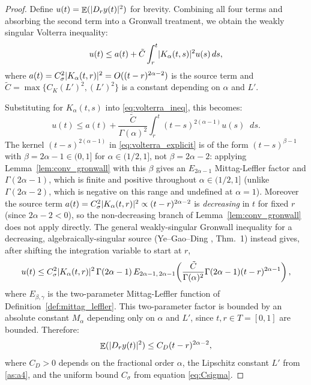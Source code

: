 \documentclass[11pt, a4paper]{article}
\theoremstyle{theoremstyle}
\theoremstyle{definitionstyle}
\newcommand{\dd}{\mathop{}\!d}
\DeclareMathOperator{\EE}{\mathbb E}
\DeclarePairedDelimiter{\abs}{\lvert}{\rvert}
\begin{document}
\begin{proof}
    Define $u(t) = \EE(\abs{D_ry(t)}^2)$ for brevity. Combining all four terms and absorbing the second term into a Gronwall treatment, we obtain the weakly singular Volterra inequality:
    \begin{equation}\label{eq:volterra_ineq}
        u(t) \leq a(t) + \tilde C \int_r^t \abs{K_\alpha(t, s)}^2 u(s) \dd{s},
    \end{equation}
    where $a(t) = C_\sigma^2 \abs{K_\alpha(t, r)}^2 = O((t - r)^{2\alpha - 2})$ is the source term and $\tilde C = \max\{C_K(L')^2, (L')^2\}$ is a constant depending on $\alpha$ and $L'$.
    
    Substituting for $K_\alpha(t, s)$ into \eqref{eq:volterra_ineq}, this becomes:
    \begin{equation}\label{eq:volterra_explicit}
        u(t) \leq a(t) + \frac{\tilde{C}}{\Gamma(\alpha)^2} \int_r^t (t - s)^{2(\alpha - 1)} u(s) \dd{s}.
    \end{equation}
    The kernel $(t-s)^{2(\alpha-1)}$ in \eqref{eq:volterra_explicit} is of the form $(t-s)^{\beta-1}$ with $\beta = 2\alpha - 1 \in (0,1]$ for $\alpha \in (1/2,1]$, not $\beta = 2\alpha-2$: applying Lemma~\ref{lem:conv_gronwall} with this $\beta$ gives an $E_{2\alpha-1}$ Mittag-Leffler factor and $\Gamma(2\alpha-1)$, which is finite and positive throughout $\alpha \in (1/2,1]$ (unlike $\Gamma(2\alpha-2)$, which is negative on this range and undefined at $\alpha=1$). Moreover the source term $a(t) = C_\sigma^2\abs{K_\alpha(t,r)}^2 \propto (t-r)^{2\alpha-2}$ is \emph{decreasing} in $t$ for fixed $r$ (since $2\alpha - 2 < 0$), so the non-decreasing branch of Lemma~\ref{lem:conv_gronwall} does not apply directly. The general weakly-singular Gronwall inequality for a decreasing, algebraically-singular source (Ye--Gao--Ding \cite{YE20071075}, Thm.~1) instead gives, after shifting the integration variable to start at $r$,
    \begin{equation}
        u(t) \leq C_\sigma^2 \abs{K_\alpha(t, r)}^2\,\Gamma(2\alpha-1)\,E_{2\alpha-1,\,2\alpha-1}\!\left ( \frac{\tilde{C}}{\Gamma(\alpha)^2}\Gamma(2\alpha - 1)(t - r)^{2\alpha - 1} \right ),
    \end{equation}
    where $E_{\beta,\gamma}$ is the two-parameter Mittag-Leffler function of Definition~\ref{def:mittag_leffler}. This two-parameter factor is bounded by an absolute constant $M_\alpha$ depending only on $\alpha$ and $L'$, since $t, r \in T = [0,1]$ are bounded. Therefore:
    \begin{equation}
        \EE(\abs{D_ry(t)}^2) \leq C_D(t - r)^{2\alpha - 2},
    \end{equation}
    where $C_D > 0$ depends on the fractional order $\alpha$, the Lipschitz constant $L'$ from \ref{as:a4}, and the uniform bound $C_\sigma$ from equation \eqref{eq:Csigma}.
\end{proof}
\end{document}
